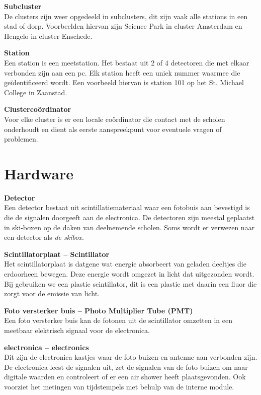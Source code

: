 \textbf{Subcluster} \\
De clusters zijn weer opgedeeld in subclusters, dit zijn vaak alle
stations in een stad of dorp. Voorbeelden hiervan zijn Science Park in
cluster Amsterdam en Hengelo in cluster Enschede.

\textbf{Station} \\
Een station is een meetstation. Het bestaat uit 2 of 4 detectoren die met elkaar
verbonden zijn aan een pc. Elk station heeft een uniek nummer waarmee
die geïdentificeerd wordt. Een voorbeeld hiervan is station 101 op het
St. Michael College in Zaanstad.

\textbf{Clustercoördinator} \\
Voor elke cluster is er een locale coördinator die contact met de
scholen onderhoudt en dient als eerste aanspreekpunt voor eventuele
vragen of problemen.


\section{Hardware}

\textbf{Detector} \\
Een detector bestaat uit scintillatiemateriaal waar een fotobuis aan
bevestigd is die de signalen doorgeeft aan de \hisparc electronica. De
detectoren zijn meestal geplaatst in ski-boxen op de daken van
deelnemende scholen. Soms wordt er verwezen naar een detector als
\emph{de skibox}.

\textbf{Scintillatorplaat -- Scintillator} \\
Het scintillatorplaat is datgene wat energie absorbeert van geladen
deeltjes die erdoorheen bewegen. Deze energie wordt omgezet in licht dat
uitgezonden wordt. Bij \hisparc gebruiken we een plastic scintillator,
dit is een plastic met daarin een fluor die zorgt voor de emissie van licht.

\textbf{Foto versterker buis -- Photo Multiplier Tube (PMT)} \\
Een foto versterker buis kan de fotonen uit de scintillator omzetten in
een meetbaar elektrisch signaal voor de \hisparc electronica.

\textbf{\hisparc electronica -- \hisparc electronics} \\
Dit zijn de electronica kastjes waar de foto buizen en \gps antenne aan
verbonden zijn. De electronica leest de signalen uit, zet de signalen van
de foto buizen om naar digitale waarden en controleert of er een air
shower heeft plaatsgevonden. Ook voorziet het metingen van tijdstempels
met behulp van de interne \gps module.


